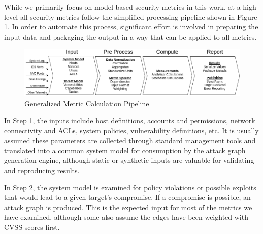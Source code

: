 


While we primarily focus on model based security metrics in this work, at a high level all security metrics follow the simplified processing pipeline shown in Figure \ref{fig:benchmarking:metric_pipeline}. In order to automate this process, significant effort is involved in preparing the input data and packaging the output in a way that can be applied to all metrics.



\begin{figure}[ht]
\centering
\includegraphics[width=.95\textwidth]{resource/img/ch_benchmarking/metric_calc_pipeline.png}
\caption{Generalized Metric Calculation Pipeline}
\label{fig:benchmarking:metric_pipeline}
\end{figure} 

In Step 1, the inputs include host definitions, accounts and permissions, network connectivity and ACLs, system policies, vulnerability definitions, etc. It is usually assumed these parameters are collected through standard management tools and translated into a common system model for consumption by the attack graph generation engine, although static or synthetic inputs are valuable for validating and reproducing results. 

In Step 2, the system model is examined for policy violations or possible exploits that would lead to a given target's compromise. If a compromise is possible, an attack graph is produced. This is the expected input for most of the metrics we have examined, although some also assume the edges have been weighted with CVSS scores first.

